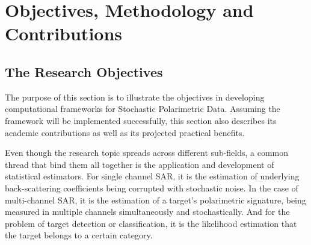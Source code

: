 
\section{Objectives, Methodology and Contributions}

       
\subsection{The Research Objectives}

The purpose of this section is to illustrate the objectives in developing computational frameworks for Stochastic Polarimetric Data. 
Assuming the framework will be implemented successfully, this section also describes its academic contributions as well as its projected practical benefits.

Even though the research topic spreads across different sub-fields, a common thread that bind them all together is the application and development of statistical estimators.
For single channel SAR, it is the estimation of underlying back-scattering coefficients being corrupted with stochastic noise.
In the case of multi-channel SAR, it is the estimation of a target's polarimetric signature, being measured in multiple channels simultaneously and stochastically.
And for the problem of target detection or classification, it is the likelihood estimation that the target belongs to a certain category.

